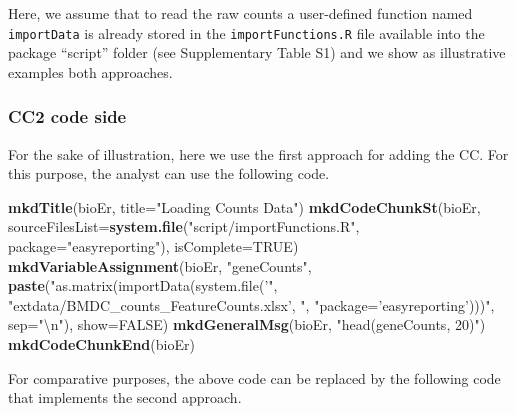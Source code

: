 \documentclass[]{article}
\newenvironment{Shaded}{\begin{snugshade}}{\end{snugshade}}
\newcommand{\CharTok}[1]{\textcolor[rgb]{0.31,0.60,0.02}{#1}}
\newcommand{\DataTypeTok}[1]{\textcolor[rgb]{0.13,0.29,0.53}{#1}}
\newcommand{\KeywordTok}[1]{\textcolor[rgb]{0.13,0.29,0.53}{\textbf{#1}}}
\newcommand{\NormalTok}[1]{#1}
\newcommand{\OtherTok}[1]{\textcolor[rgb]{0.56,0.35,0.01}{#1}}
\newcommand{\StringTok}[1]{\textcolor[rgb]{0.31,0.60,0.02}{#1}}
\begin{document}
Here, we assume that to read the raw counts a user-defined function
named \texttt{importData} is already stored in the
\texttt{importFunctions.R} file available into the package ``script''
folder (see Supplementary Table S1) and we show as illustrative examples
both approaches.

\hypertarget{cc2-code-side}{%
\subsubsection{CC2 code side}\label{cc2-code-side}}

For the sake of illustration, here we use the first approach for adding
the CC. For this purpose, the analyst can use the following code.

\begin{Shaded}
\begin{Highlighting}[]
\KeywordTok{mkdTitle}\NormalTok{(bioEr, }\DataTypeTok{title=}\StringTok{"Loading Counts Data"}\NormalTok{)}
\KeywordTok{mkdCodeChunkSt}\NormalTok{(bioEr, }\DataTypeTok{sourceFilesList=}\KeywordTok{system.file}\NormalTok{(}\StringTok{"script/importFunctions.R"}\NormalTok{, }
                                    \DataTypeTok{package=}\StringTok{"easyreporting"}\NormalTok{), }\DataTypeTok{isComplete=}\OtherTok{TRUE}\NormalTok{)}
\KeywordTok{mkdVariableAssignment}\NormalTok{(bioEr, }\StringTok{"geneCounts"}\NormalTok{, }\KeywordTok{paste}\NormalTok{(}\StringTok{"as.matrix(importData(system.file('"}\NormalTok{,}
                            \StringTok{"extdata/BMDC_counts_FeatureCounts.xlsx', "}\NormalTok{,}
                            \StringTok{"package='easyreporting')))"}\NormalTok{, }\DataTypeTok{sep=}\StringTok{"}\CharTok{\textbackslash{}n}\StringTok{"}\NormalTok{), }\DataTypeTok{show=}\OtherTok{FALSE}\NormalTok{)}
\KeywordTok{mkdGeneralMsg}\NormalTok{(bioEr, }\StringTok{"head(geneCounts, 20)"}\NormalTok{)}
\KeywordTok{mkdCodeChunkEnd}\NormalTok{(bioEr)}
\end{Highlighting}
\end{Shaded}

For comparative purposes, the above code can be replaced by the
following code that implements the second approach.
\end{document}
